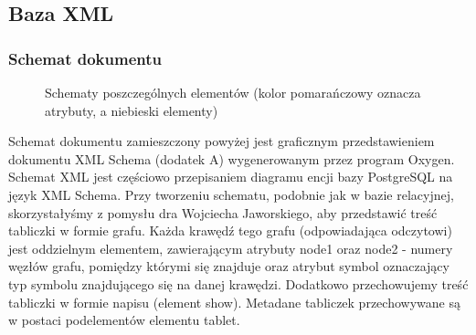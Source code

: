 \subsection{Baza XML}



\subsubsection{Schemat dokumentu}



\begin{figure}[h]
 \centering
 \caption{Schematy poszczególnych elementów (kolor pomarańczowy oznacza atrybuty, a niebieski elementy)}
\end{figure}



Schemat dokumentu zamieszczony powyżej jest graficznym przedstawieniem dokumentu XML Schema (dodatek A) wygenerowanym przez program Oxygen.\\
Schemat XML jest częściowo przepisaniem diagramu encji bazy PostgreSQL na język XML Schema. Przy tworzeniu schematu, podobnie jak w bazie relacyjnej, skorzystałyśmy z pomysłu dra Wojciecha Jaworskiego, aby przedstawić treść tabliczki w formie grafu. Każda krawędź tego grafu (odpowiadająca odczytowi) jest oddzielnym elementem, zawierającym atrybuty node1 oraz node2 - numery węzłów grafu, pomiędzy którymi się znajduje oraz atrybut symbol oznaczający typ symbolu znajdującego się na danej krawędzi. Dodatkowo przechowujemy treść tabliczki w formie napisu (element show). Metadane tabliczek przechowywane są w postaci podelementów elementu tablet.


